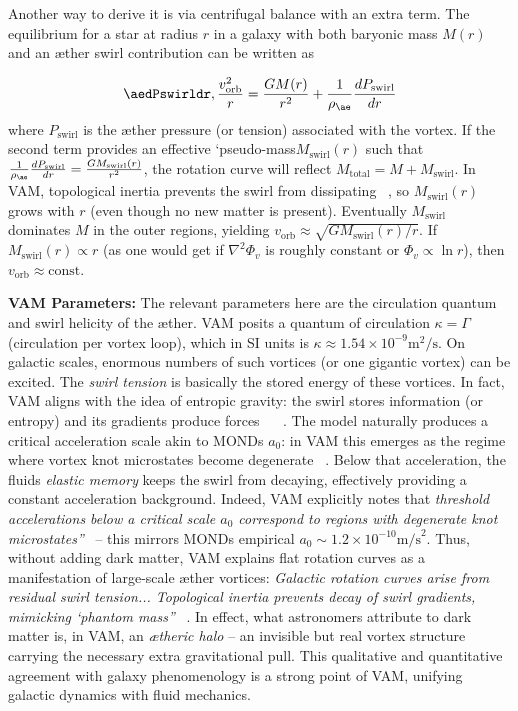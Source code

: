 \documentclass[a4paper, aps,preprint,superscriptaddress, 12pt]{revtex4}
\begin{document}
Another way to derive it is via centrifugal balance with an extra term. The equilibrium for a star at radius $r$ in a galaxy with both baryonic mass $M(r)$ and an æther swirl contribution can be written as

\begin{equation}\aedPswirldr,\frac{v_{\text{orb}}^2}{r} = \frac{GM(r)}{r^2} + \frac{1}{\rho_{\ae}}\frac{dP_{\text{swirl}}}{dr}
\end{equation}
where $P_{\text{swirl}}$ is the æther pressure (or tension) associated with the vortex. If the second term provides an effective `pseudo-mass\rqs  $M_{\text{swirl}}(r)$ such that $\frac{1}{\rho_{\ae}}\frac{dP_{\text{swirl}}}{dr} = \frac{G M_{\text{swirl}}(r)}{r^2}$, the rotation curve will reflect $M_{\text{total}} = M + M_{\text{swirl}}$. In VAM, topological inertia prevents the swirl from dissipating~\cite{Iskandarani2025c} , so $M_{\text{swirl}}(r)$ grows with $r$ (even though no new matter is present). Eventually $M_{\text{swirl}}$ dominates $M$ in the outer regions, yielding $v_{\text{orb}} \approx \sqrt{G M_{\text{swirl}}(r)/r}$. If $M_{\text{swirl}}(r)\propto r$ (as one would get if $\nabla^2\Phi_v$ is roughly constant or $\Phi_v \propto \ln r$), then $v_{\text{orb}}\approx \text{const}$.


\textbf{VAM Parameters:} The relevant parameters here are the circulation quantum and swirl helicity of the æther. VAM posits a quantum of circulation $\kappa = \Gamma$ (circulation per vortex loop), which in SI units is $\kappa \approx 1.54\times10^{-9}\text{m}^2/\text{s}$. On galactic scales, enormous numbers of such vortices (or one gigantic vortex) can be excited. The \textit{swirl tension} is basically the stored energy of these vortices. In fact, VAM aligns with the idea of entropic gravity: the swirl stores information (or entropy) and its gradients produce forces~\cite{Iskandarani2025c} ~\cite{Iskandarani2025c} . The model naturally produces a critical acceleration scale akin to MOND\rqs s $a_0$: in VAM this emerges as the regime where vortex knot microstates become degenerate~\cite{Iskandarani2025c} . Below that acceleration, the fluid\rqs s \textit{elastic memory} keeps the swirl from decaying, effectively providing a constant acceleration background. Indeed, VAM explicitly notes that \textit{\grqq threshold accelerations below a critical scale $a_0$ correspond to regions with degenerate knot microstates\textquotedblright}~\cite{Iskandarani2025c}  – this mirrors MOND\rqs s empirical $a_0 \sim 1.2\times10^{-10}\text{m/s}^2$. Thus, without adding dark matter, VAM explains flat rotation curves as a manifestation of large-scale æther vortices: \textit{\grqq Galactic rotation curves arise from residual swirl tension... Topological inertia prevents decay of swirl gradients, mimicking ‘phantom mass\rqs \textquotedblright}~\cite{Iskandarani2025c} . In effect, what astronomers attribute to dark matter is, in VAM, an \textit{ætheric halo} – an invisible but real vortex structure carrying the necessary extra gravitational pull. This qualitative and quantitative agreement with galaxy phenomenology is a strong point of VAM, unifying galactic dynamics with fluid mechanics.
\end{document}
